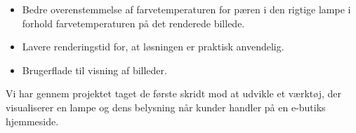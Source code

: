 \begin{itemize}
\item Bedre overenstemmelse af farvetemperaturen for pæren i den rigtige lampe i forhold farvetemperaturen på det renderede billede.
\item Lavere renderingstid for, at løsningen er praktisk anvendelig.
\item Brugerflade til visning af billeder.
\end{itemize}

Vi har gennem projektet taget de første skridt mod at udvikle et værktøj, der visualiserer en lampe og dens belysning når kunder handler på en e-butiks hjemmeside.
\clearpage